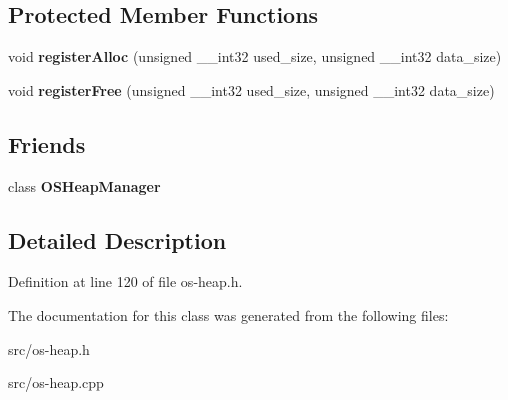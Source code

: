 \subsection*{Protected Member Functions}
\begin{DoxyCompactItemize}
\item 
void {\bfseries register\+Alloc} (unsigned \+\_\+\+\_\+int32 used\+\_\+size, unsigned \+\_\+\+\_\+int32 data\+\_\+size)\hypertarget{class_object_script_1_1_o_s_heap_manager_1_1_simple_stats_a2c7d12b6f260d7bbc4b6aefdae10708e}{}\label{class_object_script_1_1_o_s_heap_manager_1_1_simple_stats_a2c7d12b6f260d7bbc4b6aefdae10708e}

\item 
void {\bfseries register\+Free} (unsigned \+\_\+\+\_\+int32 used\+\_\+size, unsigned \+\_\+\+\_\+int32 data\+\_\+size)\hypertarget{class_object_script_1_1_o_s_heap_manager_1_1_simple_stats_aeaec9e7fba1733010f7414ddd4bd5d7e}{}\label{class_object_script_1_1_o_s_heap_manager_1_1_simple_stats_aeaec9e7fba1733010f7414ddd4bd5d7e}

\end{DoxyCompactItemize}
\subsection*{Friends}
\begin{DoxyCompactItemize}
\item 
class {\bfseries O\+S\+Heap\+Manager}\hypertarget{class_object_script_1_1_o_s_heap_manager_1_1_simple_stats_a83531e3043d7d038bd1bca03308a3502}{}\label{class_object_script_1_1_o_s_heap_manager_1_1_simple_stats_a83531e3043d7d038bd1bca03308a3502}

\end{DoxyCompactItemize}


\subsection{Detailed Description}


Definition at line 120 of file os-\/heap.\+h.



The documentation for this class was generated from the following files\+:\begin{DoxyCompactItemize}
\item 
src/os-\/heap.\+h\item 
src/os-\/heap.\+cpp\end{DoxyCompactItemize}
